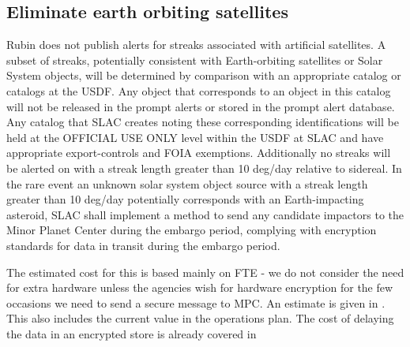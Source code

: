 
\subsection{Eliminate earth orbiting satellites} \label{sec:4eliminate}

Rubin does not publish alerts for streaks associated with artificial satellites.
A subset of streaks, potentially consistent with Earth-orbiting satellites or Solar System objects,
will be determined by comparison with an appropriate catalog or catalogs at the \gls{USDF}.
Any object that corresponds to an object in this catalog will not be released in the  prompt
alerts or stored in the prompt alert database.
Any catalog that SLAC creates noting these corresponding identifications will be held at the OFFICIAL USE ONLY level within the \gls{USDF} at \gls{SLAC} and have appropriate export-controls and \gls{FOIA} exemptions.
Additionally no streaks will be  alerted on with a streak length greater than 10 deg/day relative to sidereal.
In the rare event an unknown solar system object source with a streak  length greater than 10 deg/day potentially corresponds with an Earth-impacting asteroid, SLAC shall implement a method to send any candidate  impactors to the Minor Planet Center during the embargo period, complying with encryption standards for data in transit during the embargo  period.

The estimated cost for this is based mainly on FTE - we do not consider the need for extra hardware unless the agencies wish for hardware encryption for the few occasions we need to send a secure message to \gls{MPC}.
An estimate is given in . This also includes the current value in the operations plan.
The cost of delaying the data in an encrypted store is already covered in 




